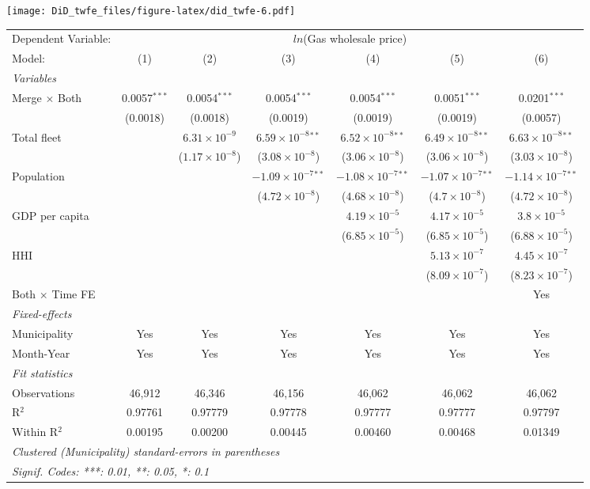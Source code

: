 \documentclass[
]{article}
\begin{document}
\texttt{[image: DiD\_twfe\_files/figure-latex/did\_twfe-6.pdf]}

\begin{tabular}{lcccccc}
\tabularnewline\midrule\midrule
Dependent Variable:&\multicolumn{6}{c}{$ln$(Gas wholesale price)}\\
Model:&(1) & (2) & (3) & (4) & (5) & (6)\\
\midrule \emph{Variables}&   &   &   &   &   &  \\
Merge $\times $ Both & 0.0057$^{***}$ & 0.0054$^{***}$ & 0.0054$^{***}$ & 0.0054$^{***}$ & 0.0051$^{***}$ & 0.0201$^{***}$\\
  &(0.0018) & (0.0018) & (0.0019) & (0.0019) & (0.0019) & (0.0057)\\
Total fleet &    & $6.31\times 10^{-9}$ & $6.59\times 10^{-8}$$^{**}$ & $6.52\times 10^{-8}$$^{**}$ & $6.49\times 10^{-8}$$^{**}$ & $6.63\times 10^{-8}$$^{**}$\\
  &   & ($1.17\times 10^{-8}$) & ($3.08\times 10^{-8}$) & ($3.06\times 10^{-8}$) & ($3.06\times 10^{-8}$) & ($3.03\times 10^{-8}$)\\
Population &    &    & $-1.09\times 10^{-7}$$^{**}$ & $-1.08\times 10^{-7}$$^{**}$ & $-1.07\times 10^{-7}$$^{**}$ & $-1.14\times 10^{-7}$$^{**}$\\
  &   &    & ($4.72\times 10^{-8}$) & ($4.68\times 10^{-8}$) & ($4.7\times 10^{-8}$) & ($4.72\times 10^{-8}$)\\
GDP per capita &    &    &    & $4.19\times 10^{-5}$ & $4.17\times 10^{-5}$ & $3.8\times 10^{-5}$\\
  &   &    &    & ($6.85\times 10^{-5}$) & ($6.85\times 10^{-5}$) & ($6.88\times 10^{-5}$)\\
HHI &    &    &    &    & $5.13\times 10^{-7}$ & $4.45\times 10^{-7}$\\
  &   &    &    &    & ($8.09\times 10^{-7}$) & ($8.23\times 10^{-7}$)\\
Both $\times$ Time FE &  &  &  &  &  & Yes\\
\midrule \emph{Fixed-effects}&   &   &   &   &   &  \\
Municipality & Yes & Yes & Yes & Yes & Yes & Yes\\
Month-Year & Yes & Yes & Yes & Yes & Yes & Yes\\
\midrule \emph{Fit statistics}&  & & & & & \\
Observations & 46,912&46,346&46,156&46,062&46,062&46,062\\
R$^2$ & 0.97761&0.97779&0.97778&0.97777&0.97777&0.97797\\
Within R$^2$ & 0.00195&0.00200&0.00445&0.00460&0.00468&0.01349\\
\midrule\midrule\multicolumn{7}{l}{\emph{Clustered (Municipality) standard-errors in parentheses}}\\
\multicolumn{7}{l}{\emph{Signif. Codes: ***: 0.01, **: 0.05, *: 0.1}}\\
\end{tabular}
\end{document}

